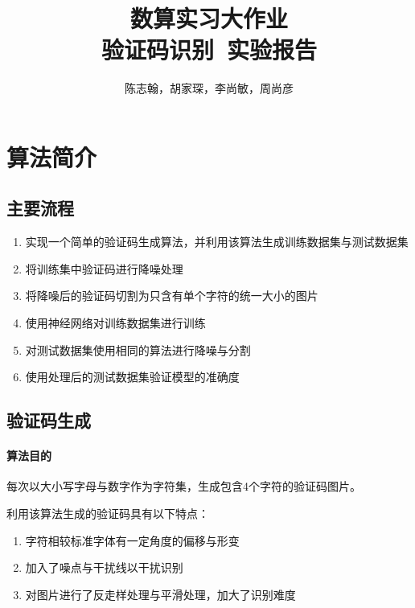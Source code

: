 \documentclass[11pt,UTF8]{article}
\title{\fontsize{25pt}{\baselineskip}\textbf{数算实习大作业\\[2ex]验证码识别\ 实验报告}}
\author{陈志翰，胡家琛，李尚敏，周尚彦}
\begin{document}
\thispagestyle{plain}

\maketitle

\tableofcontents

\setcounter{section}{0}

\section{算法简介}
\subsection{主要流程}
	\begin{enumerate}
	\item 实现一个简单的验证码生成算法，并利用该算法生成训练数据集与测试数据集
	\item 将训练集中验证码进行降噪处理
	\item 将降噪后的验证码切割为只含有单个字符的统一大小的图片
	\item 使用神经网络对训练数据集进行训练
	\item 对测试数据集使用相同的算法进行降噪与分割
	\item 使用处理后的测试数据集验证模型的准确度
	\end{enumerate}

\newpage
\subsection{验证码生成}
\paragraph{算法目的}
	每次以大小写字母与数字作为字符集，生成包含4个字符的验证码图片。

	利用该算法生成的验证码具有以下特点：
	\begin{enumerate}
	\item 字符相较标准字体有一定角度的偏移与形变
	\item 加入了噪点与干扰线以干扰识别
	\item 对图片进行了反走样处理与平滑处理，加大了识别难度
	\end{enumerate}
\end{document}
